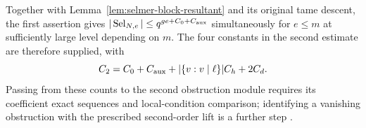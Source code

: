 Together with Lemma~\ref{lem:selmer-block-resultant} and its
original tame descent, the first assertion gives
$|\operatorname{Sel}_{N,e}|\leq q^{ge+C_0+C_{\rm aux}}$
simultaneously for $e\leq m$ at sufficiently large level depending
on $m$. The four constants in the second estimate are therefore
supplied, with
\[
          C_2=C_0+C_{\rm aux}
                     +|\{v:v\mid\ell\}|C_h+2C_d.
\]
Passing from these counts to the second obstruction module requires
its coefficient exact sequences and local-condition comparison;
identifying a vanishing obstruction with the prescribed second-order
lift is a further step \cite{alpo-second-bound-suppliers}.
